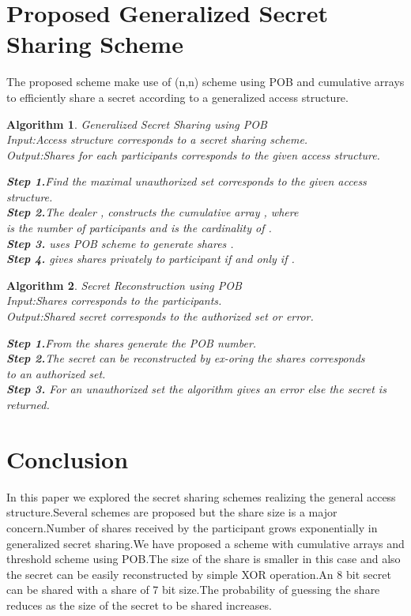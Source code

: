 \documentclass{llncs}
\newtheorem{algorithm}{Algorithm}
\begin{document}
\section{Proposed Generalized Secret Sharing Scheme}
The proposed scheme make use of (n,n) scheme using POB and cumulative arrays to  efficiently share a secret according to a generalized access structure.
\begin{algorithm}{Generalized Secret Sharing using POB}\\
Input:Access structure corresponds to a secret sharing scheme.\\
Output:Shares for each  participants corresponds to the given access structure.\\
\begin{tabbing}
\textbf{Step 1.}\=Find the maximal unauthorized set 		 
				corresponds to the given access structure.\\
\textbf{Step 2.}\>The dealer , constructs the  cumulative array ,   where  \\
\>is the number of participants and  is the cardinality of . \\         
\textbf{Step 3.}\>   uses  POB scheme  to generate  shares .\\
\textbf{Step 4.} gives shares  privately to participant  if and only if .    
\end{tabbing}
\end{algorithm}
\begin{algorithm}{Secret Reconstruction using POB}\\
Input:Shares corresponds to the participants.\\
Output:Shared secret corresponds to the authorized set or error.\\
\begin{tabbing}
\textbf{Step 1.}\=From the shares generate the POB number.\\
\textbf{Step 2.}\>The secret can be reconstructed by  ex-oring the shares corresponds\\
\> to an authorized set.\\  
\textbf{Step 3.}\>  For an unauthorized set the algorithm gives an error else the secret is returned.\\
\end{tabbing}
\end{algorithm}
\section{Conclusion}
In this paper we explored the secret sharing schemes realizing the general access structure.Several schemes are proposed but the share size is a major concern.Number of shares received by the participant grows exponentially in generalized secret sharing.We have proposed a scheme with cumulative arrays and  threshold scheme using POB.The size of the share is smaller in this case and also the secret can be easily reconstructed by simple XOR operation.An 8 bit secret can be shared with a share of 7 bit size.The probability of guessing the share reduces as the size of the secret to be shared increases.


\end{document}
